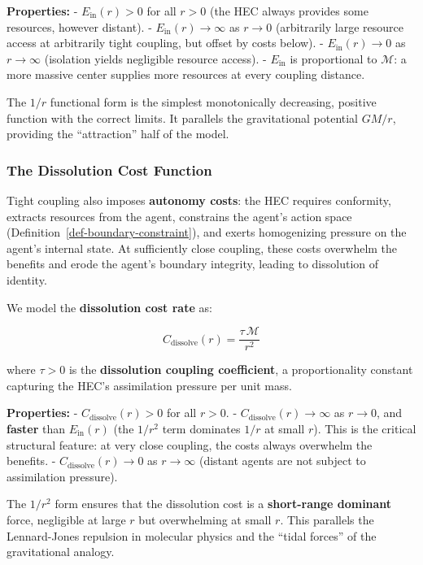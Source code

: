 \documentclass[11pt]{article}
\theoremstyle{plain}
\theoremstyle{definition}
\theoremstyle{remark}
\let\origsubsubsection\subsubsection
\renewcommand{\subsubsection}{\needspace{4\baselineskip}\origsubsubsection}
\begin{document}
\textbf{Properties:} - \(E_{\text{in}}(r) > 0\) for all \(r > 0\) (the
HEC always provides some resources, however distant). -
\(E_{\text{in}}(r) \to \infty\) as \(r \to 0\) (arbitrarily large
resource access at arbitrarily tight coupling, but offset by costs
below). - \(E_{\text{in}}(r) \to 0\) as \(r \to \infty\) (isolation
yields negligible resource access). - \(E_{\text{in}}\) is proportional
to \(\mathcal{M}\): a more massive center supplies more resources at
every coupling distance.

The \(1/r\) functional form is the simplest monotonically decreasing,
positive function with the correct limits. It parallels the
gravitational potential \(GM/r\), providing the ``attraction'' half of
the model.

\subsubsection{The Dissolution Cost
Function}\label{the-dissolution-cost-function}

Tight coupling also imposes \textbf{autonomy costs}: the HEC requires
conformity, extracts resources from the agent, constrains the agent's
action space (Definition~\ref{def-boundary-constraint}), and exerts
homogenizing pressure on the agent's internal state. At sufficiently
close coupling, these costs overwhelm the benefits and erode the agent's
boundary integrity, leading to dissolution of identity.

We model the \textbf{dissolution cost rate} as:

\[C_{\text{dissolve}}(r) = \frac{\tau \, \mathcal{M}}{r^2}\]

where \(\tau > 0\) is the \textbf{dissolution coupling coefficient}, a
proportionality constant capturing the HEC's assimilation pressure per
unit mass.

\textbf{Properties:} - \(C_{\text{dissolve}}(r) > 0\) for all \(r > 0\).
- \(C_{\text{dissolve}}(r) \to \infty\) as \(r \to 0\), and
\textbf{faster} than \(E_{\text{in}}(r)\) (the \(1/r^2\) term dominates
\(1/r\) at small \(r\)). This is the critical structural feature: at
very close coupling, the costs always overwhelm the benefits. -
\(C_{\text{dissolve}}(r) \to 0\) as \(r \to \infty\) (distant agents are
not subject to assimilation pressure).

The \(1/r^2\) form ensures that the dissolution cost is a
\textbf{short-range dominant} force, negligible at large \(r\) but
overwhelming at small \(r\). This parallels the Lennard-Jones repulsion
in molecular physics and the ``tidal forces'' of the gravitational
analogy.
\end{document}
